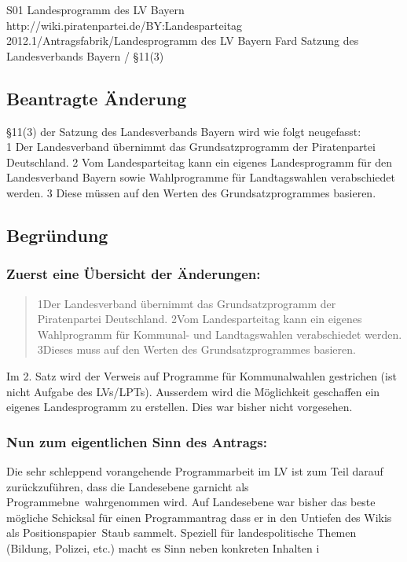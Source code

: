 \anderungsantrag
{S01}
{Landesprogramm des LV Bayern}
{http://wiki.piratenpartei.de/BY:Landesparteitag 2012.1/Antragsfabrik/Landesprogramm des LV Bayern}
{Fard}
{Satzung des Landesverbands Bayern / §11(3)}
\subsection{Beantragte Änderung}
§11(3) der Satzung des Landesverbands Bayern wird wie folgt neugefasst:\\
1 Der Landesverband übernimmt das Grundsatzprogramm der Piratenpartei Deutschland. 2 Vom
Landesparteitag kann ein eigenes Landesprogramm für den Landesverband Bayern sowie
Wahlprogramme für Landtagswahlen verabschiedet werden. 3 Diese müssen auf den Werten des
Grundsatzprogrammes basieren.
\subsection{Begründung}
\subsubsection{Zuerst eine Übersicht der Änderungen:}
\begin{quotation}
1Der Landesverband übernimmt das Grundsatzprogramm der Piratenpartei Deutschland. 2Vom
Landesparteitag kann ein eigenes Wahlprogramm für Kommunal- und Landtagswahlen
verabschiedet werden. 3Dieses muss auf den Werten des Grundsatzprogrammes basieren.
\end{quotation}
Im 2. Satz wird der Verweis auf Programme für Kommunalwahlen gestrichen (ist nicht Aufgabe des
LVs/LPTs). Ausserdem wird die Möglichkeit geschaffen ein eigenes Landesprogramm zu erstellen.
Dies war bisher nicht vorgesehen.
\subsubsection{Nun zum eigentlichen Sinn des Antrags:}
Die sehr schleppend vorangehende Programmarbeit im LV ist zum Teil darauf zurückzuführen, dass
die Landesebene garnicht als \glqq Programmebne\grqq\  wahrgenommen wird. Auf Landesebene war bisher
das beste mögliche Schicksal für einen Programmantrag dass er in den Untiefen des Wikis als
\glqq Positionspapier\grqq\  Staub sammelt. Speziell für landespolitische Themen (Bildung, Polizei, etc.)
macht es Sinn neben konkreten Inhalten i

